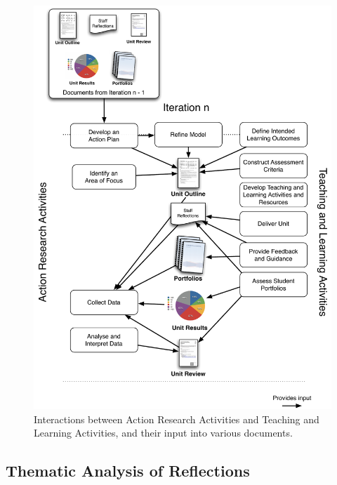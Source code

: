 \begin{figure}[thbp]
  \centering
  \includegraphics[width=\textwidth]{MillsWithData}
  \caption{Interactions between Action Research Activities and Teaching and Learning Activities, and their input into various documents.}
  \label{fig:mills_with_data}
\end{figure}



\clearpage

\subsection{Thematic Analysis of Reflections} %
\label{sub:thematic_analysis}

